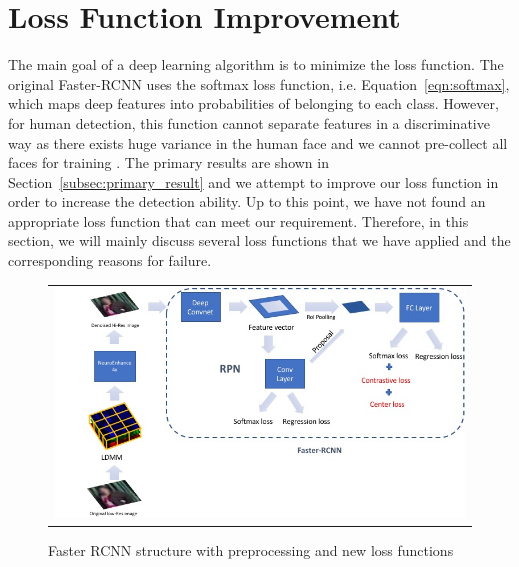 \documentclass[a4paper]{article}
\begin{document}
\section{Loss Function Improvement}
The main goal of a deep learning algorithm is to minimize the loss function. The original Faster-RCNN uses the softmax loss function, i.e. Equation~\ref{eqn:softmax}, which maps deep features into probabilities of belonging to each class. However, for human detection, this function cannot separate features in a discriminative way as there exists huge variance in the human face and we cannot pre-collect all faces for training \cite{Wen2016_facercnn}. The primary results are shown in Section~\ref{subsec:primary_result} and we attempt to improve our loss function in order to increase the detection ability. Up to this point, we have not found an appropriate loss function that can meet our requirement. Therefore, in this section, we will mainly discuss several loss functions that we have applied and the corresponding reasons for failure. 
\begin{figure}[H]
\begin{center}
\begin{tabular}{c}
\includegraphics[width=1.0\textwidth]{pipeline_fff.jpg}\\
\end{tabular}
\end{center}
\caption{Faster RCNN structure with preprocessing and new loss functions}
\label{pipeline}
\end{figure}
\end{document}
